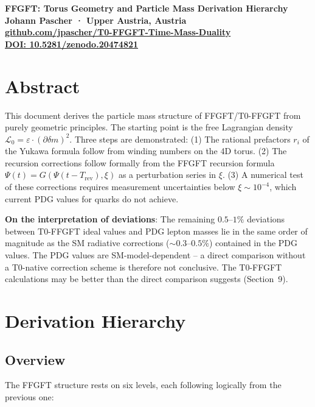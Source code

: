 {\centering
\Large\bfseries\color{T0blue}
FFGFT: Torus Geometry and Particle Mass Derivation Hierarchy\\[0.4em]
\normalsize\color{T0gray}
Johann Pascher · Upper Austria, Austria\\
\href{https://github.com/jpascher/T0-FFGFT-Time-Mass-Duality}{github.com/jpascher/T0-FFGFT-Time-Mass-Duality}\\
\href{https://zenodo.org/records/20474821}{DOI: 10.5281/zenodo.20474821}\\[0.8em]
}
\thispagestyle{firstpage}



\section*{Abstract}
This document derives the particle mass structure of FFGFT/T0-FFGFT
from purely geometric principles. The starting point is the free
Lagrangian density $\mathcal{L}_0 = \varepsilon \cdot (\partial\delta m)^2$.
Three steps are demonstrated: (1) The rational prefactors $r_i$ of the
Yukawa formula follow from winding numbers on the 4D torus. (2) The
recursion corrections follow formally from the FFGFT recursion formula
$\Psi(t) = G(\Psi(t-T_{\mathrm{rev}}), \xi)$ as a perturbation series in $\xi$.
(3) A numerical test of these corrections requires measurement uncertainties
below $\xi \sim 10^{-4}$, which current PDG values for quarks do not achieve.

\textbf{On the interpretation of deviations}: The remaining $0.5$--$1\%$
deviations between T0-FFGFT ideal values and PDG lepton masses lie in
the same order of magnitude as the SM radiative corrections ($\sim 0.3$--$0.5\%$)
contained in the PDG values. The PDG values are SM-model-dependent -- a
direct comparison without a T0-native correction scheme is therefore
not conclusive. The T0-FFGFT calculations may be better than the direct
comparison suggests (Section~9).

\tableofcontents
\newpage

\section{Derivation Hierarchy}

\subsection{Overview}

The FFGFT structure rests on six levels, each following logically
from the previous one:

